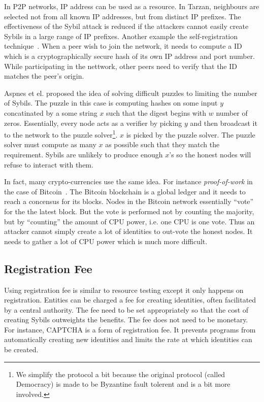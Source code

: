 
In P2P networks, IP address can be used as a resource. In
Tarzan\cite{freedman2002tarzan}, neighbours are selected not from all known IP
addresses, but from distinct IP prefixes. The effectiveness of the Sybil attack
is reduced if the attackers cannot easily create Sybils in a large range of IP
prefixes. Another example the self-registration
technique~\cite{dinger2006defending}. When a peer wish to join the network, it
needs to compute a ID which is a cryptographically secure hash of its own IP
address and port number. While participating in the nettwork, other peers need
to verify that the ID matches the peer's origin.

Aspnes et el. proposed the idea of solving difficult puzzles to limiting the
number of Sybils\cite{aspnes2005exposing}. The puzzle in this case is computing
hashes on some input $y$ concatinated by a some string $x$ such that the digest
begins with $w$ number of zeros. Essentially, every node acts as a verifier by
picking $y$ and then broadcast it to the network to the puzzle
solver\footnote{We simplify the protocol a bit because the original protocol
  (called Democracy) is made to be Byzantine fault tolerent and is a bit more
  involved.}. $x$ is picked by the puzzle solver. The puzzle solver must compute
as many $x$ as possible such that they match the requirement. Sybils are
unlikely to produce enough $x$'s so the honest nodes will refuse to interact
with them.

In fact, many crypto-currencies use the same idea. For instance
\emph{proof-of-work} in the case of Bitcoin~\cite{nakamoto2008bitcoin}. The
Bitcoin blockchain is a global ledger and it needs to reach a concensus for its
blocks. Nodes in the Bitcoin network essentially ``vote'' for the the latest
block. But the vote is performed not by counting the majority, but by
``counting'' the amount of CPU power, i.e. one CPU is one vote. Thus an attacker
cannot simply create a lot of identities to out-vote the honest nodes. It needs
to gather a lot of CPU power which is much more difficult.


\subsection{Registration Fee}
Using registration fee is similar to resource testing except it only happens on
registration. Entities can be charged a fee for creating identities, often 
facilitated by a central authority. The fee need to be set appropriately so that
the cost of creating Sybils outweights the benefits. The fee does not need to be
monetary. For instance, CAPTCHA\cite{von2003captcha} is a form of
registration fee. It prevents programs from automatically creating new
identities and limits the rate at which identities can be created.

